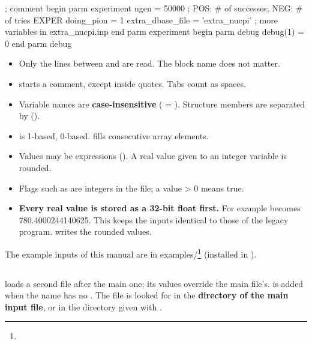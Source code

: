 \begin{simcplain}[basicstyle=\ttfamily\footnotesize]
; comment
begin parm experiment
  ngen = 50000			;  POS: # of successes; NEG: # of tries
  EXPER%
  doing_pion = 1
  extra_dbase_file = 'extra_nucpi'   ; more variables in extra_nucpi.inp
end parm experiment
begin parm debug
  debug(1) = 0
end parm debug
\end{simcplain}
\begin{itemize}
\item Only the lines between  and  are read. The block name does not matter.
\item \code{;} starts a comment, except inside quotes. Tabs count as spaces.
\item Variable names are \textbf{case-insensitive} ( = \hyperref[param:Ebeam]{}). Structure members are separated by \code{\%} (\hyperref[param:targu25thick]{}).
\item {} is 1-based,  0-based.  fills consecutive array elements.
\item Values may be expressions (\code{+\ -{}\ *\ /\ (\ )}). A real value given to an integer variable is rounded.
\item Flags such as \hyperref[param:doingu5fpion]{} are integers in the file; a value > 0 means true.
\item \textbf{Every real value is stored as a 32-bit float first.} For example  becomes 780.4000244140625. This keeps
the inputs identical to those of the legacy program.  writes the rounded values.
\end{itemize}
The example inputs of this manual are in examples/\footnote{} (installed in ).

\subsection{\texorpdfstring{}{extra\_\allowbreak{}dbase\_\allowbreak{}file}}\label{user_manual-04u5finputs:412-extrau5fdbaseu5ffile}
 loads a second file after the main one; its values override the main file's.  is
added when the name has no . The file is looked for in the \textbf{directory of the main input file}, or in the directory
given with .

